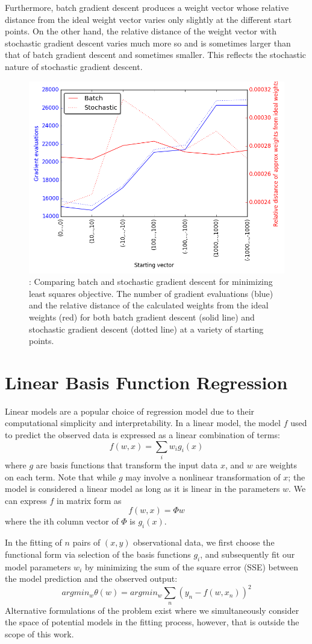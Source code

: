 \documentclass[10pt, twocolumn]{article}
\begin{document}
\medskip

Furthermore, batch gradient descent produces a weight vector whose relative distance from the ideal weight vector varies only slightly at the different start points. On the other hand, the relative distance of the weight vector with stochastic gradient descent varies much more so and is sometimes larger than that of batch gradient descent and sometimes smaller. This reflects the stochastic nature of stochastic gradient descent.

\begin{figure}
\centering
\includegraphics[width=.4\textwidth,height =0.25\textheight]{batch_stochastic_comp.png}
\caption{\label{fig:1.3}: Comparing batch and stochastic gradient descent for minimizing least squares objective. The number of gradient evaluations (blue) and the relative distance of the calculated weights from the ideal weights (red) for both batch gradient descent (solid line) and stochastic gradient descent (dotted line) at a variety of starting points.}
\end{figure}

\section{Linear Basis Function Regression}

Linear models are a popular choice of regression model due to their computational simplicity and interpretability. In a linear model, the model $f$ used to predict the observed data is expressed as a linear combination of terms:
$$ f(w,x) = \sum_i w_ig_i(x) $$
where $g$ are basis functions that transform the input data $x$, and $w$ are weights on each term. Note that while $g$ may involve a nonlinear transformation of $x$; the model is considered a linear model as long as it is linear in the parameters $w$. We can express $f$ in matrix form as
$$f(w,x) = \Phi w$$
where the ith column vector of $\Phi$ is $g_i(x)$. 

In the fitting of $n$ pairs of $(x,y)$ observational data, we first choose the functional form via selection of the basis functions $g_i$, and subsequently fit our model parameters $w_i$ by minimizing the sum of the square error (SSE) between the model prediction and the observed output: 
$$ argmin_w \theta(w) = argmin_w \sum_n (y_n - f(w,x_n))^2$$ %
Alternative formulations of the problem exist where we simultaneously consider the space of potential models in the fitting process, however, that is outside the scope of this work.
\end{document}
